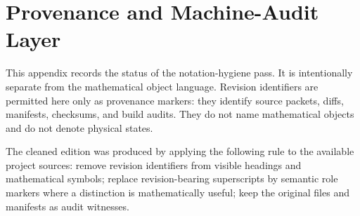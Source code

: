 \appendix
\section{Provenance and Machine-Audit Layer}

This appendix records the status of the notation-hygiene pass.  It is intentionally
separate from the mathematical object language.  Revision identifiers are permitted here
only as provenance markers: they identify source packets, diffs, manifests, checksums,
and build audits.  They do not name mathematical objects and do not denote physical
states.

The cleaned edition was produced by applying the following rule to the available project
sources: remove revision identifiers from visible headings and mathematical symbols;
replace revision-bearing superscripts by semantic role markers where a distinction is
mathematically useful; keep the original files and manifests as audit witnesses.

